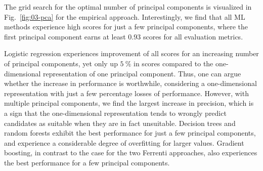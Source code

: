 \documentclass[superscriptaddress,unsortedaddress,
 amsmath,amssymb,
 aps,
]{revtex4-2}
\begin{document}
The grid search for the optimal number of principal components is visualized in Fig.~\ref{fig:03-pca} for the empirical approach. Interestingly, we find that all ML methods  experience high scores for just a few principal components, where 
the first
principal component earns at least $0.93$ scores for all evaluation metrics. %

Logistic regression experiences improvement of all scores for an increasing number of principal components, yet only up $5 \ \%$ in scores compared to the one-dimensional representation of one principal component. Thus, one can argue whether the increase in performance is worthwhile, considering a one-dimensional representation with just a few percentage losses of performance. However, with multiple principal components, we find the largest increase in precision, which is a sign that the one-dimensional representation tends to wrongly predict candidates as suitable when they are in fact unsuitable. Decision trees and random forests exhibit the best performance for just a few principal components, and experience a considerable degree of overfitting for larger values. Gradient boosting, in contrast to the case for the two Ferrenti approaches, also experiences the best performance for a few principal components.

\begin{table}[t]
\centering
\caption{ Optimal number of principal components and the respective scores (standard deviation) for each of the four ML methods logistic regression (LOG), decision trees (DT), random forests (RF) and gradient boosting (GB) in the empirical approach, as visualized by the dash-dotted line in Fig.~\ref{fig:03-pca}.}
\label{tab:03-pca}
\noindent{}
\end{table}
\end{document}
